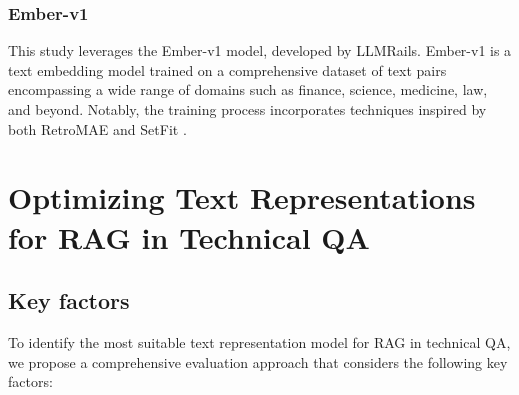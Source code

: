 \subsubsection{Ember-v1}
This study leverages the Ember-v1 model, developed by LLMRails.
Ember-v1 is a text embedding model trained on a comprehensive dataset of text pairs encompassing a wide range of domains such as finance, science, medicine, law, and beyond.
Notably, the training process incorporates techniques inspired by both RetroMAE \cite{xiao2022retromae} and SetFit \cite{tunstall2022efficient}. 





\section{Optimizing Text Representations for \ac{RAG} in Technical \ac{QA}}

\subsection{Key factors}
To identify the most suitable text representation model for \ac{RAG} in technical \ac{QA}, we propose a comprehensive evaluation approach that considers the following key factors:

